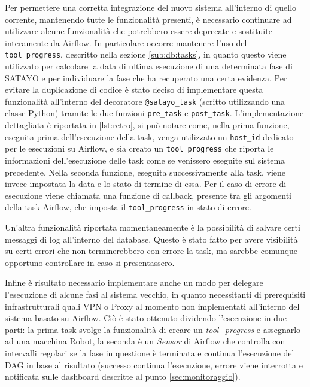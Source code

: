 Per permettere una corretta integrazione del nuovo sistema all'interno di quello
corrente, mantenendo tutte le funzionalità presenti, è necessario continuare ad utilizzare
alcune funzionalità che potrebbero essere deprecate e sostituite interamente da Airflow.
In particolare occorre mantenere l'uso del \texttt{tool\_progress}, descritto
nella sezione \ref{sub:db:tasks}, in quanto questo viene utilizzato per calcolare
la data di ultima esecuzione di una determinata fase di SATAYO e per individuare
la fase che ha recuperato una certa evidenza. Per evitare la duplicazione di
codice è stato deciso di implementare questa funzionalità all'interno del
decoratore \texttt{@satayo\_task} (scritto utilizzando una classe Python) tramite
le due funzioni \texttt{pre\_task} e \texttt{post\_task}. L'implementazione
dettagliata è riportata in \ref{lst:retro}, si può notare come, nella prima
funzione, eseguita prima dell'esecuzione della task, venga utilizzato un \texttt{host\_id}
dedicato per le esecuzioni su Airflow, e sia creato un \texttt{tool\_progress} che
riporta le informazioni dell'esecuzione delle task come se venissero eseguite sul
sistema precedente. Nella seconda funzione, eseguita successivamente alla task,
viene invece impostata la data e lo stato di termine di essa. Per il caso di errore
di esecuzione viene chiamata una funzione di callback, presente tra gli
argomenti della task Airflow, che imposta il \texttt{tool\_progress} in stato di
errore.

Un'altra funzionalità riportata momentaneamente è la possibilità di salvare
certi messaggi di log all'interno del database. Questo è stato fatto per avere visibilità
su certi errori che non terminerebbero con errore la task, ma sarebbe comunque
opportuno controllare in caso si presentassero.

Infine è risultato necessario implementare anche un modo per delegare l'esecuzione
di alcune fasi al sistema vecchio, in quanto necessitanti di prerequisiti infrastrutturali
quali VPN o Proxy al momento non implementati all'interno del sistema basato su Airflow.
Ciò è stato ottenuto dividendo l'esecuzione in due parti: la prima task svolge la
funzionalità di creare un \textit{tool\_progress} e assegnarlo ad una macchina
Robot, la seconda è un \textit{Sensor} di Airflow che controlla con intervalli
regolari se la fase in questione è terminata e continua l'esecuzione del DAG in
base al risultato (successo continua l'esecuzione, errore viene interrotta e
notificata sulle dashboard descritte al punto \ref{sec:monitoraggio}).

